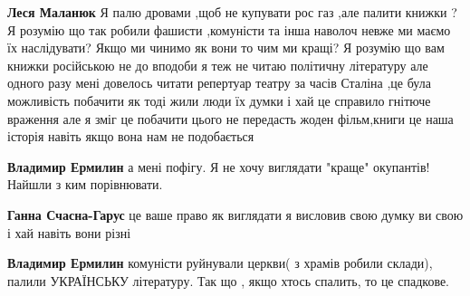  
\textbf{Леся Маланюк} Я палю дровами ,щоб не купувати рос газ ,але палити
книжки ? Я розумію що так робили фашисти ,комуністи та інша наволоч невже ми
маємо їх наслідувати? Якщо ми чинимо як вони то чим ми кращі? Я розумію що вам
книжки російською не до вподоби я теж не читаю політичну літературу але одного
разу мені довелось читати репертуар театру за часів Сталіна ,це була можливість
побачити як тоді жили люди їх думки і хай це справило гнітюче враження але я
зміг це побачити цього не передасть жоден фільм,книги це наша історія навіть
якщо вона нам не подобається

 
\textbf{Владимир Ермилин} а мені пофігу.
Я не хочу виглядати "краще" окупантів!
Найшли з ким порівнювати.

 
\textbf{Ганна Счасна-Гарус} це ваше право як виглядати я висловив свою думку ви свою і хай навіть вони різні

 
\textbf{Владимир Ермилин} комуністи руйнували церкви( з храмів робили склади), палили УКРАЇНСЬКУ літературу. Так що , якщо хтось спалить, то це спадкове.

 
